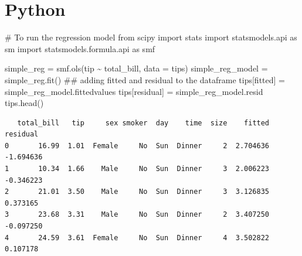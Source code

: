 \documentclass[
  letterpaper,
  DIV=11,
  numbers=noendperiod]{scrreprt}
\newenvironment{Shaded}{\begin{snugshade}}{\end{snugshade}}
\newcommand{\CommentTok}[1]{\textcolor[rgb]{0.37,0.37,0.37}{#1}}
\newcommand{\ImportTok}[1]{\textcolor[rgb]{0.00,0.46,0.62}{#1}}
\newcommand{\NormalTok}[1]{\textcolor[rgb]{0.00,0.23,0.31}{#1}}
\newcommand{\OperatorTok}[1]{\textcolor[rgb]{0.37,0.37,0.37}{#1}}
\newcommand{\StringTok}[1]{\textcolor[rgb]{0.13,0.47,0.30}{#1}}
\begin{document}
\section{Python}

\begin{Shaded}
\begin{Highlighting}[]
\CommentTok{\# To run the regression model}
\ImportTok{from}\NormalTok{ scipy }\ImportTok{import}\NormalTok{ stats}
\ImportTok{import}\NormalTok{ statsmodels.api }\ImportTok{as}\NormalTok{ sm}
\ImportTok{import}\NormalTok{ statsmodels.formula.api }\ImportTok{as}\NormalTok{ smf}

\NormalTok{simple\_reg }\OperatorTok{=}\NormalTok{ smf.ols(}\StringTok{\textquotesingle{}tip \textasciitilde{} total\_bill\textquotesingle{}}\NormalTok{, data }\OperatorTok{=}\NormalTok{ tips)}
\NormalTok{simple\_reg\_model }\OperatorTok{=}\NormalTok{ simple\_reg.fit()}
\CommentTok{\#\# adding fitted and residual to the dataframe }
\NormalTok{tips[}\StringTok{\textquotesingle{}fitted\textquotesingle{}}\NormalTok{] }\OperatorTok{=}\NormalTok{ simple\_reg\_model.fittedvalues}
\NormalTok{tips[}\StringTok{\textquotesingle{}residual\textquotesingle{}}\NormalTok{] }\OperatorTok{=}\NormalTok{ simple\_reg\_model.resid}
\NormalTok{tips.head()}
\end{Highlighting}
\end{Shaded}

\begin{verbatim}
   total_bill   tip     sex smoker  day    time  size    fitted  residual
0       16.99  1.01  Female     No  Sun  Dinner     2  2.704636 -1.694636
1       10.34  1.66    Male     No  Sun  Dinner     3  2.006223 -0.346223
2       21.01  3.50    Male     No  Sun  Dinner     3  3.126835  0.373165
3       23.68  3.31    Male     No  Sun  Dinner     2  3.407250 -0.097250
4       24.59  3.61  Female     No  Sun  Dinner     4  3.502822  0.107178
\end{verbatim}
\end{document}
